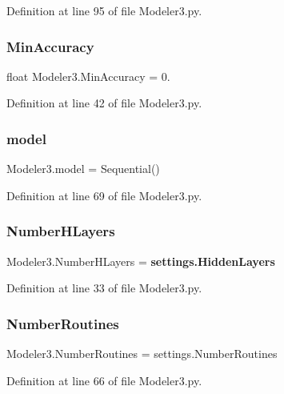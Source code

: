 Definition at line 95 of file Modeler3.\+py.

\mbox{\label{namespace_modeler3_ae6f3fed7618f865b2e865cb82de51b84}} 
\subsubsection{Min\+Accuracy}
{\footnotesize\ttfamily float Modeler3.\+Min\+Accuracy = 0.}



Definition at line 42 of file Modeler3.\+py.

\mbox{\label{namespace_modeler3_a8b0cefaf3718a6e6abda0de6dc28be32}} 
\subsubsection{model}
{\footnotesize\ttfamily Modeler3.\+model = Sequential()}



Definition at line 69 of file Modeler3.\+py.

\mbox{\label{namespace_modeler3_a7cabc5c71e73522c19507b329c009290}} 
\subsubsection{Number\+H\+Layers}
{\footnotesize\ttfamily Modeler3.\+Number\+H\+Layers = \textbf{ settings.\+Hidden\+Layers}}



Definition at line 33 of file Modeler3.\+py.

\mbox{\label{namespace_modeler3_ada7d4330af358f7e9e28ef21a29771e9}} 
\subsubsection{Number\+Routines}
{\footnotesize\ttfamily Modeler3.\+Number\+Routines = settings.\+Number\+Routines}



Definition at line 66 of file Modeler3.\+py.

\mbox{\label{namespace_modeler3_a8c4e09eb971350c3303a8afc06f6d363}} 
